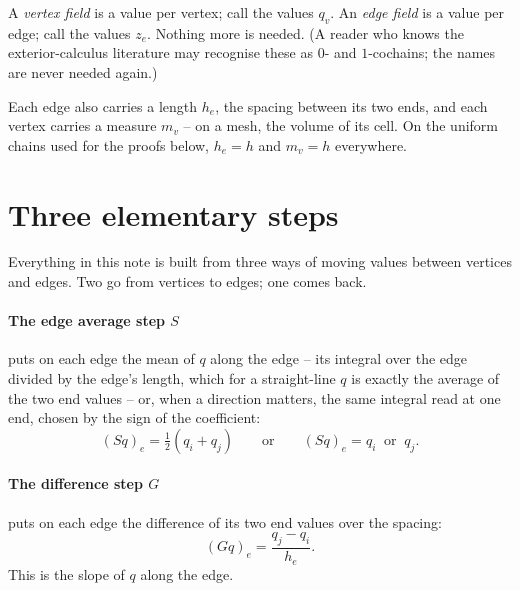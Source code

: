 \documentclass[11pt]{article}
\begin{document}
A \emph{vertex field} is a value per vertex; call the values $q_v$.
An \emph{edge field} is a value per edge; call the values $z_e$.
Nothing more is needed. (A reader who knows the exterior-calculus
literature may recognise these as $0$- and $1$-cochains; the names
are never needed again.)

Each edge also carries a length $h_e$, the spacing between its two
ends, and each vertex carries a measure $m_v$ -- on a mesh, the
volume of its cell. On the uniform chains used for the proofs below,
$h_e = h$ and $m_v = h$ everywhere.

\section{Three elementary steps}\label{sec:steps}

Everything in this note is built from three ways of moving values
between vertices and edges. Two go from vertices to edges; one comes
back.

\begin{center}
\end{center}

\paragraph{The edge average step $S$} puts on each edge the mean of $q$
along the edge -- its integral over the edge divided by the edge's
length, which for a straight-line $q$ is exactly the average of the
two end values -- or, when a direction matters, the same integral
read at one end, chosen by the sign of the coefficient:
\[
(Sq)_e = \tfrac{1}{2}(q_i + q_j)
\qquad\text{or}\qquad
(Sq)_e = q_i \ \text{ or } \ q_j .
\]

\paragraph{The difference step $G$} puts on each edge the difference
of its two end values over the spacing:
\[
(Gq)_e = \frac{q_j - q_i}{h_e}.
\]
This is the slope of $q$ along the edge.
\end{document}
